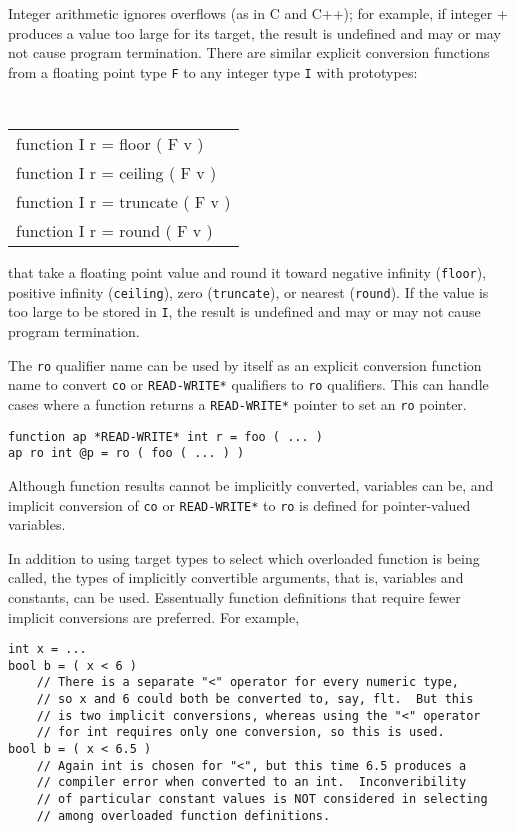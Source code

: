 \documentclass[12pt]{article}
\newenvironment{indpar}[1][0.3in]%
	{\begin{list}{}%
		     {\setlength{\itemsep}{0in}%
		      \setlength{\topsep}{0in}%
		      \setlength{\parsep}{1ex}%
		      \setlength{\labelwidth}{#1}%
		      \setlength{\leftmargin}{#1}%
		      \addtolength{\leftmargin}{\labelsep}}%
	 \item}%
	{\end{list}}
\begin{document}
Integer arithmetic ignores overflows (as in C and C++); for example,
if integer + produces a value too large for its
target, the result is undefined and may or may not cause program
termination.
There are similar explicit conversion functions from a floating
point type {\tt F} to any integer type {\tt I} with prototypes:
\begin{center} \tt
\begin{tabular}{l}
function I r = floor ( F v ) \\
function I r = ceiling ( F v ) \\
function I r = truncate  ( F v ) \\
function I r = round ( F v ) \\
\end{tabular}
\end{center}
that take a floating point value and round it toward
negative infinity ({\tt floor}),
positive infinity ({\tt ceiling}),
zero ({\tt truncate}),
or nearest ({\tt round}).  If the value is too large to be stored
in {\tt I}, the result is undefined and may or may not cause
program termination.

The {\tt ro} qualifier name can be used by itself as an explicit
conversion function name to convert
{\tt co} or {\tt *READ-WRITE*} qualifiers to {\tt ro} qualifiers.
This can handle cases where a function returns a {\tt *READ-WRITE*}
pointer to set an {\tt ro} pointer.

\begin{indpar}\begin{verbatim}
function ap *READ-WRITE* int r = foo ( ... )
ap ro int @p = ro ( foo ( ... ) )
\end{verbatim}\end{indpar}

Although function results cannot be implicitly converted, variables
can be, and implicit conversion of {\tt co} or {\tt *READ-WRITE*} to
{\tt ro} is defined for pointer-valued variables.

In addition to using target types to select which overloaded
function is being called, the types of implicitly convertible
arguments, that is, variables and constants, can be used.
Essentually function definitions that require fewer implicit
conversions are preferred.  For example,

\begin{indpar}\begin{verbatim}
int x = ...
bool b = ( x < 6 )
    // There is a separate "<" operator for every numeric type,
    // so x and 6 could both be converted to, say, flt.  But this
    // is two implicit conversions, whereas using the "<" operator
    // for int requires only one conversion, so this is used.
bool b = ( x < 6.5 )
    // Again int is chosen for "<", but this time 6.5 produces a
    // compiler error when converted to an int.  Inconveribility
    // of particular constant values is NOT considered in selecting
    // among overloaded function definitions.
\end{verbatim}\end{indpar}
\end{document}
